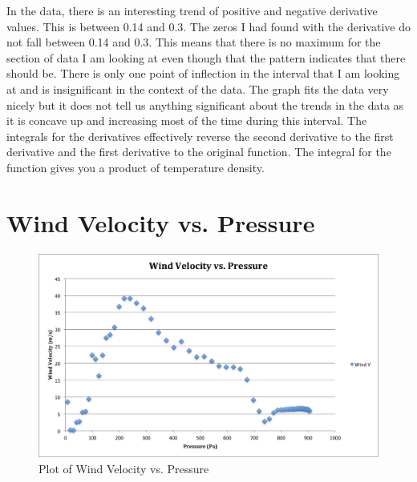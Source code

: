 \documentclass{article}
\begin{document}
In the data, there is an interesting trend of positive and negative derivative values. This is between 0.14 and 0.3. The zeros I had found with the derivative do not fall between 0.14 and 0.3. This means that there is no maximum for the section of data I am looking at even though that the pattern indicates that there should be. There is only one point of inflection in the interval that I am looking at and is insignificant in the context of the data.
The graph fits the data very nicely but it does not tell us anything significant about the trends in the data as it is concave up and increasing most of the time during this interval.
The integrals for the derivatives effectively reverse the second derivative to the first derivative and the first derivative to the original function. The integral for the function gives you a product of temperature density.






\part{Wind Velocity vs. Pressure}
\label{george}


\begin{figure}[H]
\centering
\includegraphics[width=\textwidth]{IMG1CDATA.png}
\caption{Plot of Wind Velocity vs. Pressure}
\end{figure}
\end{document}
